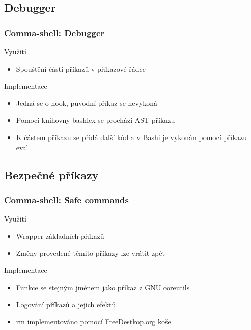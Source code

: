 \documentclass{beamer}
\begin{document}
\subsection{Debugger}
\begin{frame}
	\frametitle{Comma-shell: Debugger}
	
	\begin{exampleblock}{Využití}
		\begin{itemize}
			\item Spouštění částí příkazů v příkazové řádce
		\end{itemize}
	\end{exampleblock}		
	
	
	\begin{exampleblock}{Implementace}
		\begin{itemize}
			\item Jedná se o hook, původní příkaz se nevykoná
			\item Pomocí knihovny bashlex se prochází AST příkazu
			\item K částem příkazu se přidá další kód a v Bashi je vykonán pomocí příkazu eval 
		\end{itemize}
	\end{exampleblock}		
\end{frame}


\subsection{Bezpečné příkazy}
\begin{frame}
	\frametitle{Comma-shell: Safe commands}
	
	\begin{exampleblock}{Využití}
		\begin{itemize}
			\item Wrapper základních příkazů
			\item Změny provedené těmito příkazy lze vrátit zpět
		\end{itemize}
	\end{exampleblock}		
	
	
	\begin{exampleblock}{Implementace}
		\begin{itemize}
			\item Funkce se stejným jménem jako příkaz z GNU coreutils
			\item Logování příkazů a jejich efektů
			\item rm implementováno pomocí FreeDestkop.org koše
		\end{itemize}
	\end{exampleblock}		
\end{frame}
\end{document}
